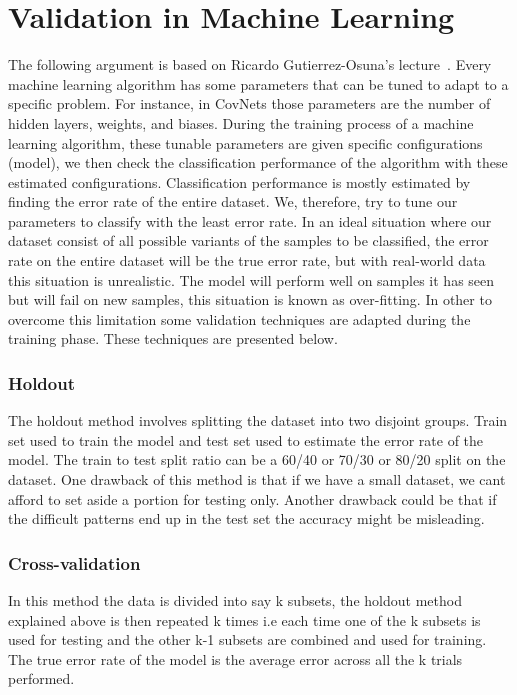 \documentclass[12pt, a4paper,oneside]{report}
\begin{document}
\section{Validation in Machine Learning}
The following argument is based on Ricardo Gutierrez-Osuna's lecture~\cite{validation}.
Every machine learning algorithm has some parameters that can be tuned to adapt to a specific problem. For instance, in CovNets those parameters are the number of hidden layers, weights, and biases. During the training process of a machine learning algorithm, these tunable parameters are given specific configurations (model), we then check the classification performance of the algorithm with these estimated configurations. Classification performance is mostly estimated by finding the error rate of the entire dataset. We, therefore, try to tune our parameters to classify with the least error rate. In an ideal situation where our dataset consist of all possible variants of the samples to be classified, the error rate on the entire dataset will be the true error rate, but with real-world data this situation is unrealistic. The model will perform well on samples it has seen but will fail on new samples, this situation is known as over-fitting. In other to overcome this limitation some validation techniques are adapted during the training phase. These techniques are presented below.

\subsubsection{Holdout}
The holdout method involves splitting the dataset into two disjoint groups. Train set used to train the model and test set used to estimate the error rate of the model. The train to test split ratio can be a 60/40 or 70/30 or 80/20 split on the dataset. One drawback of this method is that if we have a small dataset, we cant afford to set aside a portion for testing only. Another drawback could be that if the difficult patterns end up in the test set the accuracy might be misleading.

\subsubsection{Cross-validation}
In this method the data is divided into say k subsets, the holdout method explained above is then repeated k times i.e each time one of the k subsets is used for testing and the other k-1 subsets are combined and used for training. The true error rate of the model is the average error across all the k trials performed.
\end{document}

